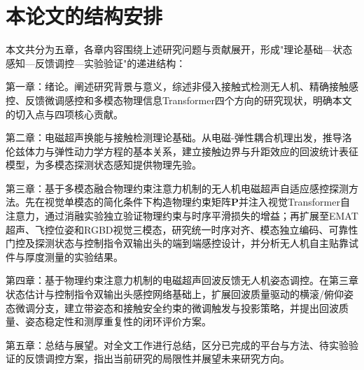 \section{本论文的结构安排}

本文共分为五章，各章内容围绕上述研究问题与贡献展开，形成"理论基础—状态感知—反馈调控—实验验证"的递进结构：

第一章：绪论。阐述研究背景与意义，综述非侵入接触式检测无人机、精确接触感控、反馈微调感控和多模态物理信息Transformer四个方向的研究现状，明确本文的切入点与四项核心贡献。

第二章：电磁超声换能与接触检测理论基础。从电磁-弹性耦合机理出发，推导洛伦兹体力与弹性动力学方程的基本关系，建立接触边界与升距效应的回波统计表征模型，为多模态探测状态感知提供物理先验。

第三章：基于多模态融合物理约束注意力机制的无人机电磁超声自适应感控探测方法。先在视觉单模态的简化条件下构造物理约束矩阵$\mathbf{P}$并注入视觉Transformer自注意力，通过消融实验独立验证物理约束与时序平滑损失的增益；再扩展至EMAT超声、飞控位姿和RGBD视觉三模态，研究统一时序对齐、模态独立编码、可靠性门控及探测状态与控制指令双输出头的端到端感控设计，并分析无人机自主贴靠试件与厚度测量的实验结果。

第四章：基于物理约束注意力机制的电磁超声回波反馈无人机姿态调控。在第三章状态估计与控制指令双输出头感控网络基础上，扩展回波质量驱动的横滚/俯仰姿态微调分支，建立带姿态和接触安全约束的微调触发与投影策略，并提出回波质量、姿态稳定性和测厚重复性的闭环评价方案。

第五章：总结与展望。对全文工作进行总结，区分已完成的平台与方法、待实验验证的反馈调控方案，指出当前研究的局限性并展望未来研究方向。
